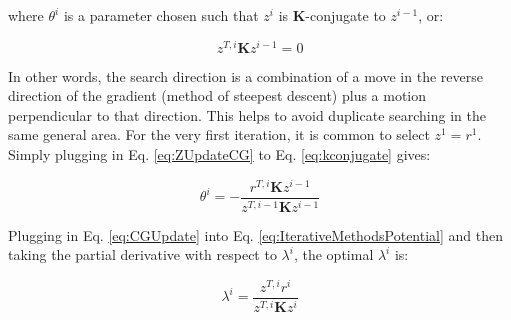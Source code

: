 \documentclass[10pt]{article}
\newcommand{\beq}{\begin{equation}}
\newcommand{\eeq}{\end{equation}}
\begin{document}
where \(\theta^i\) is a parameter chosen such that \(z^i\) is \(\textbf{K}\)-conjugate to \(z^{i-1}\), or:

\beq
\label{eq:kconjugate}
z^{T,i}\textbf{K}z^{i-1}=0
\eeq

In other words, the search direction is a combination of a move in the reverse direction of the gradient (method of steepest descent) plus a motion perpendicular to that direction. This helps to avoid duplicate searching in the same general area. For the very first iteration, it is common to select \(z^1=r^1\). Simply plugging in Eq. \eqref{eq:ZUpdateCG} to Eq. \eqref{eq:kconjugate} gives:

\beq
\theta^i=-\frac{r^{T,i}\textbf{K}z^{i-1}}{z^{T,i-1}\textbf{K}z^{i-1}}
\eeq

Plugging in Eq. \eqref{eq:CGUpdate} into Eq. \eqref{eq:IterativeMethodsPotential} and then taking the partial derivative with respect to \(\lambda^i\), the optimal \(\lambda^i\) is:

\beq
\label{eq:UpdateCG}
\lambda^i=\frac{z^{T,i}r^i}{z^{T,i}\textbf{K}z^i}
\eeq
\end{document}

